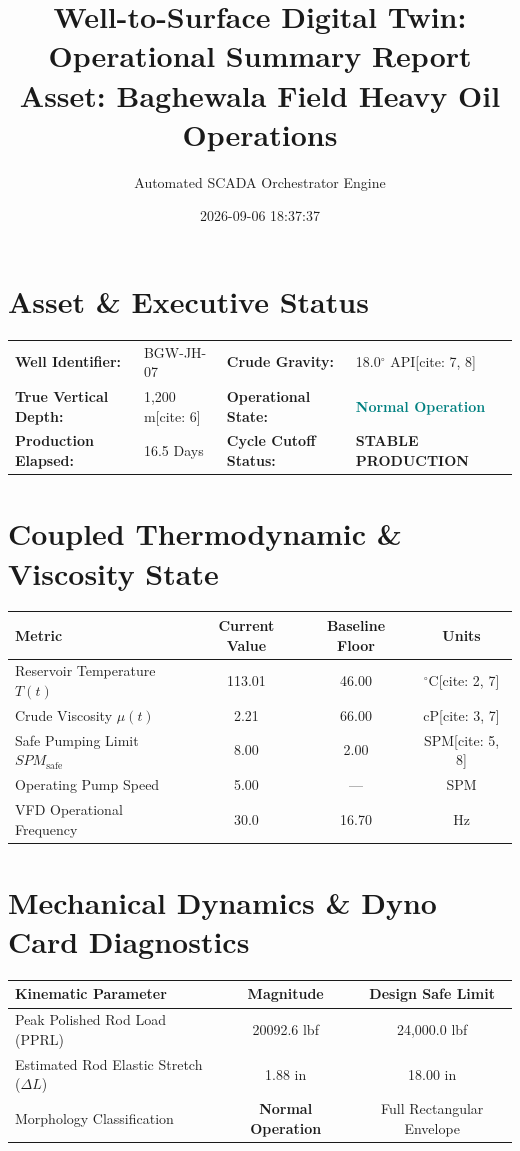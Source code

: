 \documentclass[10pt,a4paper]{article}
\title{\textbf{Well-to-Surface Digital Twin: Operational Summary Report}\\\large Asset: Baghewala Field Heavy Oil Operations}
\author{Automated SCADA Orchestrator Engine}
\date{2026-09-06 18:37:37}
\begin{document}
\maketitle

\section{Asset \& Executive Status}
\begin{tabular}{ll@{\hspace{2cm}}ll}
\textbf{Well Identifier:} & BGW-JH-07 & \textbf{Crude Gravity:} & 18.0$^\circ$ API[cite: 7, 8] \\
\textbf{True Vertical Depth:} & 1,200 m[cite: 6] & \textbf{Operational State:} & \textcolor{teal}{\textbf{Normal Operation}} \\
\textbf{Production Elapsed:} & 16.5 Days & \textbf{Cycle Cutoff Status:} & \textbf{STABLE PRODUCTION} \\
\end{tabular}

\vspace{0.4cm}
\section{Coupled Thermodynamic \& Viscosity State}
\begin{table}[h!]
\centering
\begin{tabular}{lccc}
\toprule
\textbf{Metric} & \textbf{Current Value} & \textbf{Baseline Floor} & \textbf{Units} \\
\midrule
Reservoir Temperature $T(t)$ & 113.01 & 46.00 & $^\circ$C[cite: 2, 7] \\
Crude Viscosity $\mu(t)$ & 2.21 & 66.00 & cP[cite: 3, 7] \\
Safe Pumping Limit $SPM_{\text{safe}}$ & 8.00 & 2.00 & SPM[cite: 5, 8] \\
Operating Pump Speed & 5.00 & --- & SPM \\
VFD Operational Frequency & 30.0 & 16.70 & Hz \\
\bottomrule
\end{tabular}
\end{table}

\section{Mechanical Dynamics \& Dyno Card Diagnostics}
\begin{table}[h!]
\centering
\begin{tabular}{lcc}
\toprule
\textbf{Kinematic Parameter} & \textbf{Magnitude} & \textbf{Design Safe Limit} \\
\midrule
Peak Polished Rod Load (PPRL) & 20092.6 lbf & 24,000.0 lbf \\
Estimated Rod Elastic Stretch ($\Delta L$) & 1.88 in & 18.00 in \\
Morphology Classification & \textbf{Normal Operation} & Full Rectangular Envelope \\
\bottomrule
\end{tabular}
\end{table}
\end{document}
